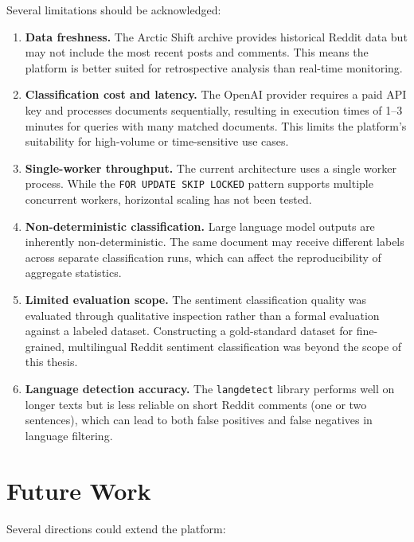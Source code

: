 Several limitations should be acknowledged:

\begin{enumerate}
    \item \textbf{Data freshness.} The Arctic Shift archive provides historical Reddit data but may not include the most recent posts and comments. This means the platform is better suited for retrospective analysis than real-time monitoring.

    \item \textbf{Classification cost and latency.} The OpenAI provider requires a paid API key and processes documents sequentially, resulting in execution times of 1--3 minutes for queries with many matched documents. This limits the platform's suitability for high-volume or time-sensitive use cases.

    \item \textbf{Single-worker throughput.} The current architecture uses a single worker process. While the \texttt{FOR UPDATE SKIP LOCKED} pattern supports multiple concurrent workers, horizontal scaling has not been tested.

    \item \textbf{Non-deterministic classification.} Large language model outputs are inherently non-deterministic. The same document may receive different labels across separate classification runs, which can affect the reproducibility of aggregate statistics.

    \item \textbf{Limited evaluation scope.} The sentiment classification quality was evaluated through qualitative inspection rather than a formal evaluation against a labeled dataset. Constructing a gold-standard dataset for fine-grained, multilingual Reddit sentiment classification was beyond the scope of this thesis.

    \item \textbf{Language detection accuracy.} The \texttt{langdetect} library performs well on longer texts but is less reliable on short Reddit comments (one or two sentences), which can lead to both false positives and false negatives in language filtering.
\end{enumerate}

\section{Future Work}
\label{sec:future_work}

Several directions could extend the platform:


